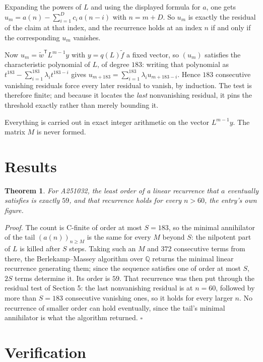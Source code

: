 \documentclass[11pt]{article}
\newtheorem{theorem}{Theorem}
\theoremstyle{definition}
\begin{document}
Expanding the powers of $L$ and using the displayed formula for $a$, one gets $u_m = a(n) - \sum_{i=1}^{D} c_i\,a(n-i)$ with $n = m + D$. So $u_m$ is exactly the residual of the claim at that index, and the recurrence holds at an index $n$ if and only if the corresponding $u_m$ vanishes.

Now $u_m = \tilde w^{\mathsf T} L^{m-1} y$ with $y = q(L)\tilde f$ a fixed vector, so $(u_m)$ satisfies the characteristic polynomial of $L$, of degree $183$: writing that polynomial as $t^{183} - \sum_{i=1}^{183} \lambda_i t^{183-i}$ gives $u_{m+183} = \sum_{i=1}^{183} \lambda_i u_{m+183-i}$. Hence $183$ consecutive vanishing residuals force every later residual to vanish, by induction. The test is therefore finite; and because it locates the {\itshape last} nonvanishing residual, it pins the threshold exactly rather than merely bounding it.

Everything is carried out in exact integer arithmetic on the vector $L^{m-1}y$. The matrix $M$ is never formed.

\section{Results}

\begin{theorem} For A251032, the least order of a linear recurrence that $a$ eventually satisfies is exactly $59$, and that recurrence holds for every $n > 60$, the entry's own figure.\end{theorem}

{\itshape Proof.} The count is C-finite of order at most $S = 183$, so the minimal annihilator of the tail $(a(n))_{n \ge M}$ is the same for every $M$ beyond $S$: the nilpotent part of $L$ is killed after $S$ steps. Taking such an $M$ and $372$ consecutive terms from there, the Berlekamp--Massey algorithm over $\mathbb{Q}$ returns the minimal linear recurrence generating them; since the sequence satisfies one of order at most $S$, $2S$ terms determine it. Its order is $59$. That recurrence was then put through the residual test of Section 5: the last nonvanishing residual is at $n = 60$, followed by more than $S = 183$ consecutive vanishing ones, so it holds for every larger $n$. No recurrence of smaller order can hold eventually, since the tail's minimal annihilator is what the algorithm returned. $\square$

\section{Verification}
\end{document}

